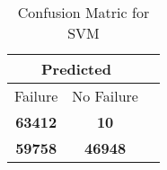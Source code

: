 \begin{table}[] 
\caption{Confusion Matric for SVM} 
\label{Table: Prediction Accuracy-NoneSVMDecisionTrees100EKF-ignoresolarPanelDipole100.9EKF-top2-solarPanelDipole} 
\centering 
\begin{tabular} 
 {@{}ccc@{}} 
\toprule 
\multicolumn{2}{c}{\textbf{Predicted}}
 \\ \midrule 
\multicolumn{1}{|c|}{Failure} & 
\multicolumn{1}{c|}{No Failure}
 \\ \midrule 
\multicolumn{1}{|c|}{\color{green}\textbf{63412}} & 
\multicolumn{1}{c|}{\color{red}\textbf{10}}
 \\ \midrule 
\multicolumn{1}{|c|}{\color{red}\textbf{59758}} & 
\multicolumn{1}{c|}{\color{green}\textbf{46948}}
 \\ \bottomrule 
\end{tabular} 
\end{table} 
